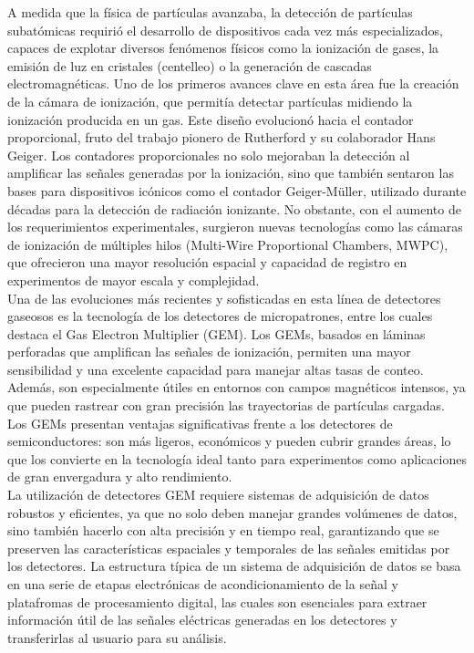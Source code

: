 \documentclass{article}
\begin{document}
\noindent A medida que la física de partículas avanzaba, la detección de partículas subatómicas requirió el desarrollo de dispositivos cada vez más especializados, capaces de explotar diversos fenómenos físicos como la ionización de gases, la emisión de luz en cristales (centelleo) o la generación de cascadas electromagnéticas. Uno de los primeros avances clave en esta área fue la creación de la cámara de ionización, que permitía detectar partículas midiendo la ionización producida en un gas. Este diseño evolucionó hacia el contador proporcional, fruto del trabajo pionero de Rutherford y su colaborador Hans Geiger. Los contadores proporcionales no solo mejoraban la detección al amplificar las señales generadas por la ionización, sino que también sentaron las bases para dispositivos icónicos como el contador Geiger-Müller, utilizado durante décadas para la detección de radiación ionizante. No obstante, con el aumento de los requerimientos experimentales, surgieron nuevas tecnologías como las cámaras de ionización de múltiples hilos (Multi-Wire Proportional Chambers, MWPC), que ofrecieron una mayor resolución espacial y capacidad de registro en experimentos de mayor escala y complejidad.\\

\noindent Una de las evoluciones más recientes y sofisticadas en esta línea de detectores gaseosos es la tecnología de los detectores de micropatrones, entre los cuales destaca el Gas Electron Multiplier (GEM). Los GEMs, basados en láminas perforadas que amplifican las señales de ionización, permiten una mayor sensibilidad y una excelente capacidad para manejar altas tasas de conteo. Además, son especialmente útiles en entornos con campos magnéticos intensos, ya que pueden rastrear con gran precisión las trayectorias de partículas cargadas. Los GEMs presentan ventajas significativas frente a los detectores de semiconductores: son más ligeros, económicos y pueden cubrir grandes áreas, lo que los convierte en la tecnología ideal tanto para experimentos como aplicaciones de gran envergadura y alto rendimiento.\\

\noindent La utilización de detectores GEM requiere sistemas de adquisición de datos robustos y eficientes, ya que no solo deben manejar grandes volúmenes de datos, sino también hacerlo con alta precisión y en tiempo real, garantizando que se preserven las características espaciales y temporales de las señales emitidas por los detectores. La estructura típica de un sistema de adquisición de datos se basa en una serie de etapas electrónicas de acondicionamiento de la señal y platafromas de procesamiento digital, las cuales son esenciales para extraer información útil de las señales eléctricas generadas en los detectores y transferirlas al usuario para su análisis.\\
\end{document}
